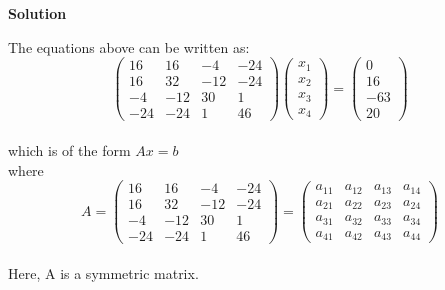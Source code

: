 \documentclass[a4paper, 12pt]{report}
\begin{document}
{      \begin{center}
      	\textbf{Solution}
      \end{center}
      The equations above can be written as:\\
      \begin{equation*}
      \begin{pmatrix}
      16 & 16 & -4 & -24\\
      16 & 32 & -12 & -24\\
      -4 & -12 & 30 & 1\\
      -24 & -24 & 1 & 46
      \end{pmatrix}
      \begin{pmatrix}
      x_1\\
      x_2\\
      x_3\\
      x_4
      \end{pmatrix}
      =
      \begin{pmatrix}
      0\\
      16\\
      -63\\
      20
      \end{pmatrix}
      \end{equation*}\\
      which is of the form $Ax=b$\\
      where  
       \begin{equation*}A =
      \begin{pmatrix}
      16 & 16 & -4 & -24\\
      16 & 32 & -12 & -24\\
      -4 & -12 & 30 & 1\\
      -24 & -24 & 1 & 46
      \end{pmatrix}
      =
      \begin{pmatrix}
      a_{11} & a_{12} & a_{13} & a_{14}\\
      a_{21} & a_{22} & a_{23} & a_{24}\\
      a_{31} & a_{32} & a_{33} & a_{34}\\
      a_{41} & a_{42} & a_{43} & a_{44}
      \end{pmatrix}
      \end{equation*}\\
      Here, A is a symmetric matrix.\\
      
}
\end{document}
